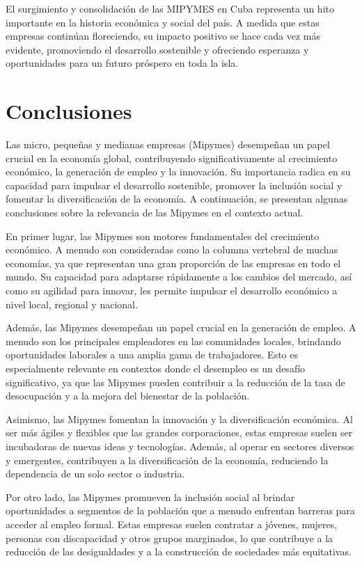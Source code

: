 \documentclass{article}
\begin{document}
El surgimiento y consolidación de las MIPYMES en Cuba representa un hito importante en la historia económica y social del país. A medida que estas empresas continúan floreciendo, su impacto positivo se hace cada vez más evidente, promoviendo el desarrollo sostenible y ofreciendo esperanza y oportunidades para un futuro próspero en toda la isla.

	\newpage
	
	\section{Conclusiones}
	Las micro, pequeñas y medianas empresas (Mipymes) desempeñan un papel crucial en la economía global, contribuyendo significativamente al crecimiento económico, la generación de empleo y la innovación. Su importancia radica en su capacidad para impulsar el desarrollo sostenible, promover la inclusión social y fomentar la diversificación de la economía. A continuación, se presentan algunas conclusiones sobre la relevancia de las Mipymes en el contexto actual.
	
	En primer lugar, las Mipymes son motores fundamentales del crecimiento económico. A menudo son consideradas como la columna vertebral de muchas economías, ya que representan una gran proporción de las empresas en todo el mundo. Su capacidad para adaptarse rápidamente a los cambios del mercado, así como su agilidad para innovar, les permite impulsar el desarrollo económico a nivel local, regional y nacional.
	
	Además, las Mipymes desempeñan un papel crucial en la generación de empleo. A menudo son los principales empleadores en las comunidades locales, brindando oportunidades laborales a una amplia gama de trabajadores. Esto es especialmente relevante en contextos donde el desempleo es un desafío significativo, ya que las Mipymes pueden contribuir a la reducción de la tasa de desocupación y a la mejora del bienestar de la población.
	
	Asimismo, las Mipymes fomentan la innovación y la diversificación económica. Al ser más ágiles y flexibles que las grandes corporaciones, estas empresas suelen ser incubadoras de nuevas ideas y tecnologías. Además, al operar en sectores diversos y emergentes, contribuyen a la diversificación de la economía, reduciendo la dependencia de un solo sector o industria.
	
	Por otro lado, las Mipymes promueven la inclusión social al brindar oportunidades a segmentos de la población que a menudo enfrentan barreras para acceder al empleo formal. Estas empresas suelen contratar a jóvenes, mujeres, personas con discapacidad y otros grupos marginados, lo que contribuye a la reducción de las desigualdades y a la construcción de sociedades más equitativas.
	
\end{document}
